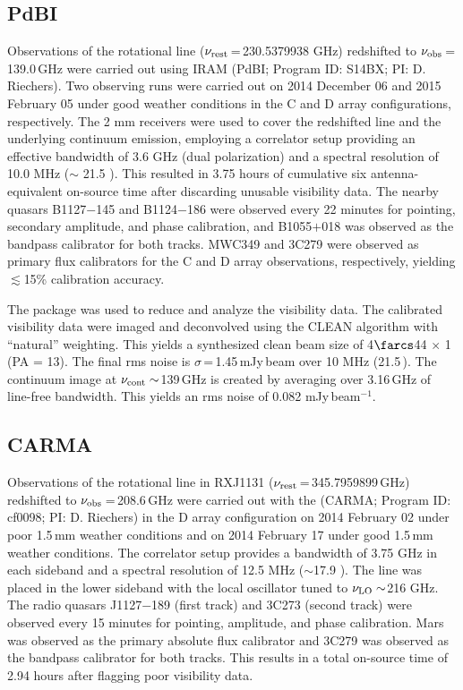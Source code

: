 \documentclass[]{emulateapj}
\begin{document}
\subsection{PdBI \bco}
Observations of the \bco rotational line
($\nu_{\rm rest}$\,=\,230.5379938 GHz) redshifted to $\nu_{\rm obs}$\,=\,139.0\,GHz
were carried out using IRAM \pdbi (PdBI; Program ID: S14BX; PI: D.
Riechers). Two observing runs were carried out on 2014 December 06 and 2015
February 05 under good weather conditions in the C and D array configurations,
respectively. The 2 mm receivers were used to cover the redshifted \bco line
and the underlying continuum emission, employing a correlator setup providing
an effective bandwidth of 3.6 GHz (dual polarization) and a spectral resolution of 10.0 MHz ($\sim$
21.5 \kms). This resulted in 3.75 hours of cumulative six antenna-equivalent on-source
 time after discarding unusable visibility data.
The nearby quasars B1127$-$145 and B1124$-$186 were observed every 22 minutes
for pointing, secondary amplitude, and phase calibration, and B1055$+$018 was
observed as the bandpass calibrator for both tracks.
MWC349 and 3C279 were observed as primary flux calibrators for the C and D
array observations, respectively, yielding $\lesssim$15\% calibration accuracy.

The  package was used to reduce and analyze the visibility data.
The calibrated visibility data were imaged and deconvolved using the CLEAN algorithm with ``natural''
weighting. This yields a synthesized clean beam size of 4$\farcs$44 $\times$ 1 (PA = 13\degr).
The final rms noise is $\sigma$\,=\,1.45\,mJy\,beam\pmOne
over 10 MHz (21.5\,\kms). The continuum image at $\nu_{\rm cont}\sim$139\,GHz
is created by averaging over 3.16\,GHz of line-free bandwidth. This
yields an rms noise of 0.082 mJy\,beam$^{-1}$. %

\subsection{CARMA \cco}
Observations of the \cco rotational line in RXJ1131
($\nu_{\rm rest}$\,=\,345.7959899\,GHz) redshifted to $\nu_{\rm obs}$\,=\,208.6\,GHz
were carried out with the \carma (CARMA;
Program ID: cf0098; PI: D. Riechers)
in the D array configuration on 2014 February 02 under poor 1.5\,mm
weather conditions and on 2014 February 17 under good 1.5\,mm
weather conditions. The correlator setup provides a bandwidth of 3.75 GHz in
each sideband and a spectral resolution of 12.5 MHz ($\sim$17.9 \kms). The
line was placed in the lower sideband with the local oscillator tuned to $\nu_{\rm LO}\sim$216 GHz. The radio quasars J1127$-$189 (first track) and 3C273
(second track) were observed
every 15 minutes for pointing, amplitude, and phase calibration. Mars was
observed as the primary absolute flux calibrator and 3C279 was observed as
the bandpass calibrator for both tracks. This results in a total on-source time of 2.94 hours after flagging poor
visibility data.
\end{document}
